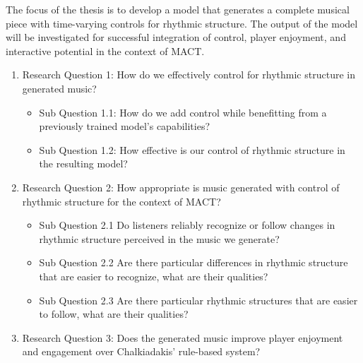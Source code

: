 The focus of the thesis is to develop a model that generates a complete musical piece with time-varying controls for rhythmic structure. The output of the model will be investigated for successful integration of control, player enjoyment, and interactive potential in the context of MACT. 
  
\begin{enumerate}
\item{Research Question 1}: How do we effectively control for rhythmic structure in generated music?
\begin{itemize}
\item{Sub Question 1.1}: How do we add control while benefitting from a previously trained model's capabilities?
\item{Sub Question 1.2}: How effective is our control of rhythmic structure in the resulting model?
\end{itemize}
\item{Research Question 2}: How appropriate is music generated with control of rhythmic structure for the context of MACT?
\begin{itemize}
\item{Sub Question 2.1} Do listeners reliably recognize or follow changes in rhythmic structure perceived in the music we generate?
\item{Sub Question 2.2} Are there particular differences in rhythmic structure that are easier to recognize, what are their qualities?
\item{Sub Question 2.3} Are there particular rhythmic structures that are easier to follow, what are their qualities? 
\end{itemize}
\item {Research Question 3}: Does the generated music improve player enjoyment and engagement over Chalkiadakis' \cite{Chalkiadakis_2022} rule-based system? 
\end{enumerate}
